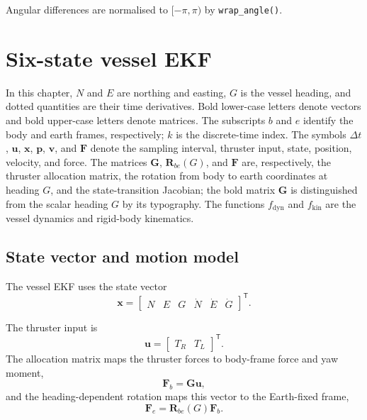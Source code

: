 \documentclass[11pt,a4paper]{article}
\begin{document}
Angular differences are normalised to $[-\pi,\pi)$ by \texttt{wrap\_angle()}.

\section{Six-state vessel EKF}

In this chapter, $N$ and $E$ are northing and easting, $G$ is the vessel
heading, and dotted quantities are their time derivatives. Bold lower-case
letters denote vectors and bold upper-case letters denote matrices. The
subscripts $b$ and $e$ identify the body and earth frames, respectively; $k$
is the discrete-time index. The symbols $\Delta t$, $\bm{u}$, $\bm{x}$,
$\bm{p}$, $\bm{v}$, and $\bm{F}$ denote the sampling interval, thruster input,
state, position, velocity, and force. The matrices $\bm{G}$, $\bm{R}_{be}(G)$,
and $\bm{F}$ are, respectively, the thruster allocation matrix, the rotation
from body to earth coordinates at heading $G$, and the state-transition
Jacobian; the bold matrix $\bm{G}$ is distinguished from the scalar heading
$G$ by its typography. The functions $f_{\mathrm{dyn}}$ and
$f_{\mathrm{kin}}$ are the vessel dynamics and rigid-body kinematics.

\subsection{State vector and motion model}

The vessel EKF uses the state vector
\begin{equation}
\bm{x}=
\begin{bmatrix}
N & E & G & \dot{N} & \dot{E} & \dot{G}
\end{bmatrix}^{\mathsf T}.
\end{equation}

The thruster input is
\begin{equation}
\bm{u}=\begin{bmatrix}T_R&T_L\end{bmatrix}^{\mathsf T}.
\end{equation}
The allocation matrix maps the thruster forces to body-frame force and yaw moment,
\begin{equation}
\bm{F}_b=\bm{G}\bm{u},
\end{equation}
and the heading-dependent rotation maps this vector to the Earth-fixed frame,
\begin{equation}
\bm{F}_e=\bm{R}_{be}(G)\bm{F}_b.
\end{equation}
\end{document}
